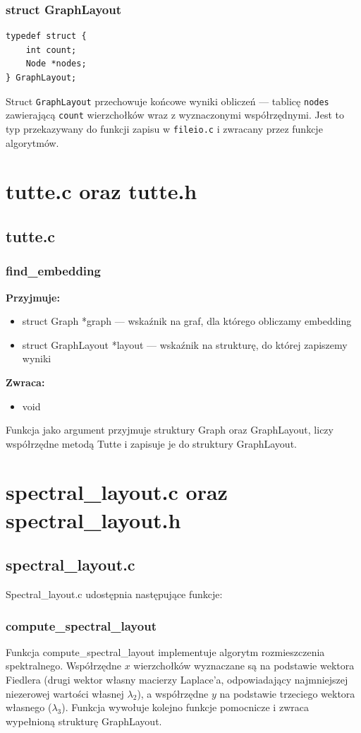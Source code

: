 \documentclass[12pt]{article}
\begin{document}
\subsubsection{struct GraphLayout}
\begin{lstlisting}
typedef struct {
    int count;
    Node *nodes;
} GraphLayout;
\end{lstlisting}
Struct \texttt{GraphLayout} przechowuje końcowe wyniki obliczeń --- tablicę \texttt{nodes}
zawierającą \texttt{count} wierzchołków wraz z wyznaczonymi współrzędnymi. Jest to typ
przekazywany do funkcji zapisu w \texttt{fileio.c} i zwracany przez funkcje algorytmów.
\section{tutte.c oraz tutte.h}
\subsection{tutte.c}
\subsubsection{find\_embedding}
\textbf{Przyjmuje:}
\begin{itemize}
	\item struct Graph *graph --- wskaźnik na graf, dla którego obliczamy embedding
	\item struct GraphLayout *layout --- wskaźnik na strukturę, do której zapiszemy wyniki
\end{itemize}
\textbf{Zwraca:}
\begin{itemize}
	\item void
\end{itemize}
Funkcja jako argument przyjmuje struktury Graph oraz GraphLayout, liczy
współrzędne metodą Tutte i zapisuje je do struktury GraphLayout.


\section{spectral\_layout.c oraz spectral\_layout.h}
\subsection{spectral\_layout.c}
Spectral\_layout.c udostępnia następujące funkcje:
\subsubsection{compute\_spectral\_layout}
Funkcja compute\_spectral\_layout implementuje algorytm rozmieszczenia spektralnego.
Współrzędne $x$ wierzchołków wyznaczane są na podstawie wektora Fiedlera (drugi wektor
własny macierzy Laplace'a, odpowiadający najmniejszej niezerowej wartości własnej $\lambda_2$),
a współrzędne $y$ na podstawie trzeciego wektora własnego ($\lambda_3$). Funkcja wywołuje
kolejno funkcje pomocnicze i zwraca wypełnioną strukturę GraphLayout.
\end{document}
